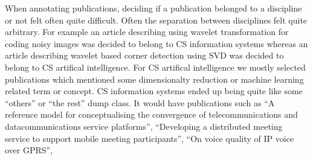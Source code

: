 When annotating publications, deciding if a publication belonged to
a discipline or not felt often quite difficult. Often the 
separation between disciplines felt quite arbitrary. For example
an article describing using wavelet transformation for coding noisy
images was decided to belong to CS information systems whereas an
article describing wavelet based corner detection using SVD was
decided to belong to CS artifical intelligence.
For CS artifical intelligence we mostly selected publications which
mentioned some dimensionalty reduction or machine learning related
term or concept.
CS information systems ended up being quite like some ``others'' or
``the rest'' dump class. It would have publications such as
``A reference model for conceptualising the convergence of 
telecommunications and datacommunications service platforms'',
``Developing a distributed meeting service to support mobile 
meeting participants'',
``On voice quality of IP voice over GPRS'',
